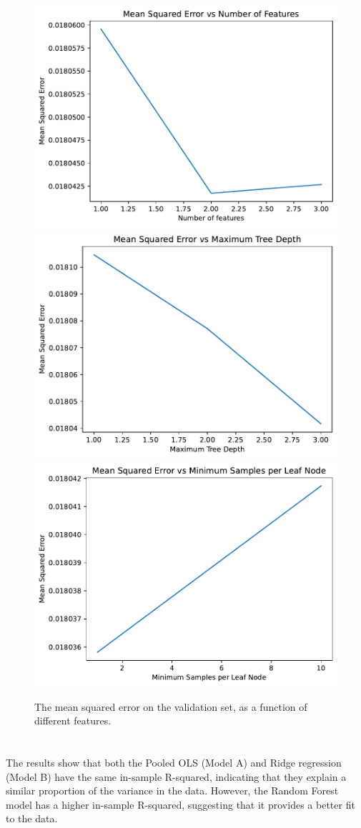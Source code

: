 \documentclass[hidelinks,12pt]{article}
\begin{document}
\subsection{}
\begin{figure}[htbp]
    \centering
    \caption{The mean squared error on the validation set, as a function of different features.}
    \includegraphics[width=.55\textwidth]{out/2_3_1.pdf}
    \includegraphics[width=.55\textwidth]{out/2_3_2.pdf}
    \includegraphics[width=.55\textwidth]{out/2_3_3.pdf}
\end{figure}

\FloatBarrier

\section{}
The results show that both the Pooled OLS (Model A) and Ridge regression (Model B) have the same in-sample R-squared, indicating that they explain a similar proportion of the variance in the data. However, the Random Forest model has a higher in-sample R-squared, suggesting that it provides a better fit to the data.
\end{document}
